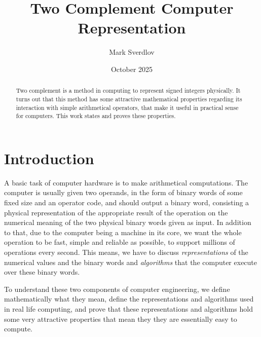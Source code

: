 \documentclass{amsart}
\title{Two Complement Computer Representation}
\author{Mark Sverdlov}
\date{October 2025}
\theoremstyle{plain}
\theoremstyle{definition}
\theoremstyle{definition}
\theoremstyle{remark}
\begin{document}
    \begin{abstract}
        Two complement is a method in computing to represent signed integers physically. It turns out that this method has some attractive mathematical properties regarding its interaction with simple arithmetical operators, that make it useful in practical sense for computers. This work states and proves these properties.
    \end{abstract}
    \maketitle
    \section{Introduction} 
       A basic task of computer hardware is to make arithmetical computations. The computer is usually given two operands, in the form of binary words of some fixed size and an operator code, and should output a binary word, consisting a physical representation of the appropriate result of the operation on the numerical meaning of the two physical binary words given as input. In addition to that, due to the computer being a machine in its core, we want the whole
       operation to be fast, simple and reliable as possible, to support millions of operations every second. This means, we have to discuss \emph{representations} of the numerical values and the binary words and \emph{algorithms} that the computer execute over these binary words.

    To understand these two components of computer engineering, we define mathematically what they mean, define the representations and algorithms used in real life computing, and prove that these representations  and algorithms hold some very attractive properties that mean they they are essentially easy to compute.
\end{document}
